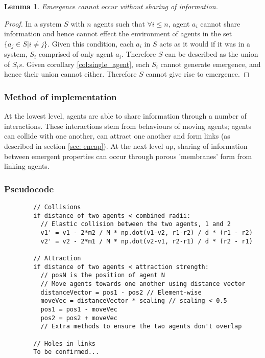 \documentclass{article}
\newtheorem{lemma}[theorem]{Lemma}
\begin{document}
      \begin{lemma}
        Emergence cannot occur without sharing of information.
      \end{lemma}
      \begin{proof}

        In a system $S$ with $n$ agents such that $\forall i \leq n$, agent $a_i$ cannot share information and hence cannot effect the environment of agents in the set $\{ a_j \in S | i \not = j \}$. Given this condition, each $a_i$ in $S$ acts as it would if it was in a system, $S_i$ comprised of only agent $a_i$. Therefore $S$ can be described as the union of $S_i s$. Given corollary \ref{col:single_agent}, each $S_i$ cannot generate emergence, and hence their union cannot either. Therefore $S$ cannot give rise to emergence. 

      \end{proof}

    \subsubsection{Method of implementation}

      At the lowest level, agents are able to share information through a number of interactions. These interactions stem from behaviours of moving agents; agents can collide with one another, can attract one another and form links (as described in section \ref{sec: encap}). At the next level up, sharing of information between emergent properties can occur through porous 'membranes' form from linking agents.

    \subsubsection{Pseudocode}
      
      \begin{verbatim}
        // Collisions
        if distance of two agents < combined radii:
          // Elastic collision between the two agents, 1 and 2
          v1' = v1 - 2*m2 / M * np.dot(v1-v2, r1-r2) / d * (r1 - r2) 
          v2' = v2 - 2*m1 / M * np.dot(v2-v1, r2-r1) / d * (r2 - r1)

        // Attraction
        if distance of two agents < attraction strength:
          // posN is the position of agent N
          // Move agents towards one another using distance vector 
          distanceVector = pos1 - pos2 // Element-wise 
          moveVec = distanceVector * scaling // scaling < 0.5
          pos1 = pos1 - moveVec
          pos2 = pos2 + moveVec
          // Extra methods to ensure the two agents don't overlap

        // Holes in links
        To be confirmed...
      \end{verbatim}
\end{document}
